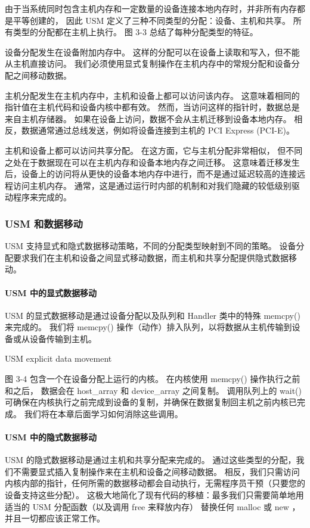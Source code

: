 由于当系统同时包含主机内存和一定数量的设备连接本地内存时，并非所有内存都是平等创建的，
因此 USM 定义了三种不同类型的分配：设备、主机和共享。 所有类型的分配都在主机上执行。 
图 3-3 总结了每种分配类型的特征。

设备分配发生在设备附加内存中。 这样的分配可以在设备上读取和写入，但不能从主机直接访问。 
我们必须使用显式复制操作在主机内存中的常规分配和设备分配之间移动数据。

主机分配发生在主机内存中，主机和设备上都可以访问该内存。 这意味着相同的指针值在主机代码和设备内核中都有效。 
然而，当访问这样的指针时，数据总是来自主机存储器。 如果在设备上访问，数据不会从主机迁移到设备本地内存。 
相反，数据通常通过总线发送，例如将设备连接到主机的 PCI Express (PCI-E)。

主机和设备上都可以访问共享分配。 在这方面，它与主机分配非常相似，
但不同之处在于数据现在可以在主机内存和设备本地内存之间迁移。 
这意味着迁移发生后，设备上的访问将从更快的设备本地内存中进行，而不是通过延迟较高的连接远程访问主机内存。 
通常，这是通过运行时内部的机制和对我们隐藏的较低级别驱动程序来完成的。

\subsubsection{USM 和数据移动}
USM 支持显式和隐式数据移动策略，不同的分配类型映射到不同的策略。 
设备分配要求我们在主机和设备之间显式移动数据，而主机和共享分配提供隐式数据移动。

\paragraph{USM 中的显式数据移动}

USM 的显式数据移动是通过设备分配以及队列和 Handler 类中的特殊 memcpy() 来完成的。 
我们将 memcpy() 操作（动作）排入队列，以将数据从主机传输到设备或从设备传输到主机。

{\color{red} USM explicit data movement }

图 3-4 包含一个在设备分配上运行的内核。 在内核使用 memcpy() 操作执行之前和之后，
数据会在 host\_array 和 device\_array 之间复制。 
调用队列上的 wait() 可确保在内核执行之前完成到设备的复制，并确保在数据复制回主机之前内核已完成。 
我们将在本章后面学习如何消除这些调用。

\paragraph{USM 中的隐式数据移动}

USM 的隐式数据移动是通过主机和共享分配来完成的。 
通过这些类型的分配，我们不需要显式插入复制操作来在主机和设备之间移动数据。 
相反，我们只需访问内核内部的指针，任何所需的数据移动都会自动执行，无需程序员干预（只要您的设备支持这些分配）。 
这极大地简化了现有代码的移植：最多我们只需要简单地用适当的 USM 分配函数（以及调用 free 来释放内存）
替换任何 malloc 或 new ，并且一切都应该正常工作。

